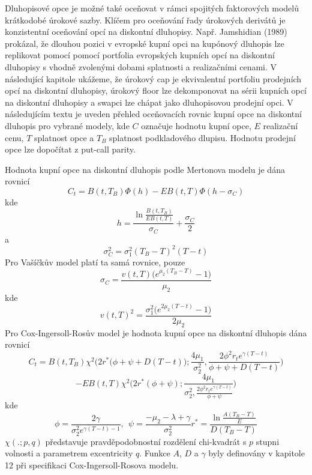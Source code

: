 \documentclass[a4paper]{book}
\begin{document}
Dluhopisové opce je možné také oceňovat v rámci spojitých faktorových modelů krátkodobé úrokové sazby. Klíčem pro oceňování řady úrokových derivátů je konzistentní oceňování opcí na diskontní dluhopisy. Např. Jamshidian (1989) prokázal, že dlouhou pozici v evropské kupní opci na kupónový dluhopis lze replikovat pomocí pomocí portfolia evropských kupních opcí na diskontní dluhopisy s vhodně zvolenými dobami splatnosti a realizačními cenami. V následující kapitole ukážeme, že úrokový cap je ekvivalentní portfoliu prodejních opcí na diskontní dluhopisy, úrokový floor lze dekomponovat na sérii kupních opcí na diskontní dluhopisy a swapci lze chápat jako dluhopisovou prodejní opci. V následujícím textu je uveden přehled oceňovacích rovnic kupní opce na diskontní dluhopis pro vybrané modely, kde $C$ označuje hodnotu kupní opce, $E$ realizační cenu, $T$ splatnost opce a $T_B$ splatnost podkladového dlupisu. Hodnotu prodejní opce lze dopočítat z put-call parity.

Hodnota kupní opce na diskontní dluhopis podle Mertonova modelu je dána rovnicí
\begin{equation*}
C_t = B(t,T_B) \Phi(h) - EB(t,T)\Phi(h - \sigma_C)
\end{equation*}
kde
\begin{equation*}
h = \frac{\ln \frac{B(t,T_B)}{EB(t,T)}}{\sigma_C} + \frac{\sigma_C}{2}
\end{equation*}
a
\begin{equation*}
\sigma_C^2 = \sigma_1^2(T_B - T)^2(T - t)
\end{equation*}
Pro Vašíčkův model platí ta samá rovnice, pouze
\begin{equation*}
\sigma_C = \frac{v(t,T)\big(e^{\mu_2(T_B - T)} - 1\big)}{\mu_2}
\end{equation*}
kde
\begin{equation*}
v(t,T)^2 = \frac{\sigma_1^2 \big(e^{2 \mu_2(T - t)} - 1\big)}{2 \mu_2}
\end{equation*}
Pro Cox-Ingersoll-Rosův model je hodnota kupní opce na diskontní dluhopis dána rovnicí
\begin{equation*}
C_t = B(t, T_B) \chi^2 \Big(2r^*\big(\phi + \psi + D(T - t)\big); \frac{4 \mu_1}{\sigma_2^2}, \frac{2 \phi^2 r_t e^{\gamma(T - t)}}{\phi + \psi + D(T - t)} \Big)
\end{equation*}
\begin{equation*}
- EB(t,T)\chi^2\Big( 2r^* (\phi + \psi); \frac{4 \mu_1}{\sigma_2^2, \frac{2 \phi^2 r_t e^{\gamma(T - t)}}{\phi + \psi}}\Big)
\end{equation*}
kde
\begin{equation*}
\phi = \frac{2 \gamma}{\sigma_2^2 e^{\gamma(T - t) - 1}},~~\psi = \frac{-\mu_2 - \lambda + \gamma}{\sigma_2^2}r^* = \frac{\ln \frac{A(T_B - T)}{E}}{D(T_B - T)}
\end{equation*}
$\chi(.;p,q)$ představuje pravděpodobnostní rozdělení chi-kvadrát s $p$ stupni volnosti a parametrem excentricity $q$. Funkce $A$, $D$ a $\gamma$ byly definovány v kapitole 12 při specifikaci Cox-Ingersoll-Rosova modelu.
\end{document}
